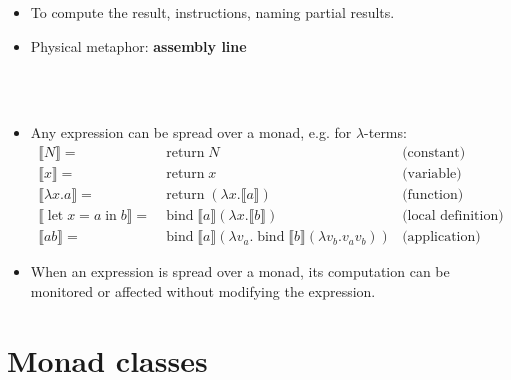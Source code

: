 \documentclass{beamer}
\newcommand{\tmop}[1]{\ensuremath{\operatorname{#1}}}
\newcommand{\tmstrong}[1]{\textbf{#1}}
\begin{document}
\begin{itemize}
  \item To compute the result, {} instructions, naming partial
  results.
  
  \item Physical metaphor: {\tmstrong{assembly line}}
  
  
  {}{}{\hlopt{=}}{\hlendline{}}\\
  {\hlstd{ \ \ }}{}{\hlendline{}}\\
  {}{\hlopt{<-- }}{}{\hlopt{<-- }}{}{\hlopt{<-- }}{}{\hlendline{}}
  
  \item Any expression can be spread over a monad, e.g. for $\lambda$-terms:
  \begin{eqnarray*}
    \llbracket N \rrbracket = & \tmop{return} N & \text{(constant)}\\
    \llbracket x \rrbracket = & \tmop{return} x & \text{(variable)}\\
    \llbracket \lambda x.a \rrbracket = & \tmop{return} (\lambda x. \llbracket
    a \rrbracket) & \text{(function)}\\
    \llbracket \tmop{let} x = a \tmop{in} b \rrbracket = & \tmop{bind}
    \llbracket a \rrbracket  (\lambda x. \llbracket b \rrbracket) &
    \text{(local definition)}\\
    \llbracket a b \rrbracket = & \tmop{bind} \llbracket a \rrbracket 
    (\lambda v_a . \tmop{bind} \llbracket b \rrbracket  (\lambda v_b .v_a
    v_b)) & \text{(application)}
  \end{eqnarray*}
  \item When an expression is spread over a monad, its computation can be
  monitored or affected without modifying the expression.
\end{itemize}


\section{Monad classes}
\end{document}
